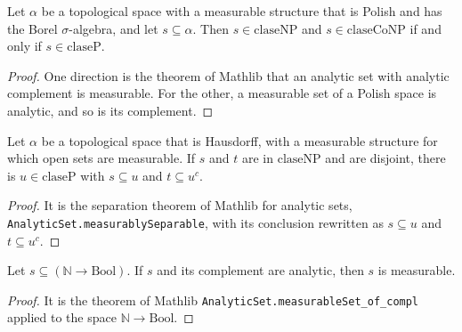 \begin{theorem}
  \label{thm:infinite-np-inter-conp}
  \leanok
  \own{}
  Let $\alpha$ be a topological space with a measurable structure that is Polish and has the Borel $\sigma$-algebra, and
  let $s \subseteq \alpha$. Then $s \in \mathrm{claseNP}$ and $s \in \mathrm{claseCoNP}$ if and only if
  $s \in \mathrm{claseP}$.
\end{theorem}

\begin{proof}
  \leanok
  One direction is the theorem of Mathlib that an analytic set with analytic complement is measurable. For the other,
  a measurable set of a Polish space is analytic, and so is its complement.
\end{proof}

\begin{theorem}
  \label{thm:infinite-separacion-lusin}
  \leanok
  \own{}
  Let $\alpha$ be a topological space that is Hausdorff, with a measurable structure for which open sets are
  measurable. If $s$ and $t$ are in $\mathrm{claseNP}$ and are disjoint, there is $u \in \mathrm{claseP}$ with
  $s \subseteq u$ and $t \subseteq u^{c}$.
\end{theorem}

\begin{proof}
  \leanok
  It is the separation theorem of Mathlib for analytic sets, \texttt{AnalyticSet.measurablySeparable}, with its
  conclusion rewritten as $s \subseteq u$ and $t \subseteq u^{c}$.
\end{proof}

\begin{theorem}
  \label{thm:infinite-suslin-cantor}
  \leanok
  \own{}
  Let $s \subseteq (\mathbb{N} \to \mathrm{Bool})$. If $s$ and its complement are analytic, then $s$ is measurable.
\end{theorem}

\begin{proof}
  \leanok
  It is the theorem of Mathlib \texttt{AnalyticSet.measurableSet\_of\_compl} applied to the space
  $\mathbb{N} \to \mathrm{Bool}$.
\end{proof}

